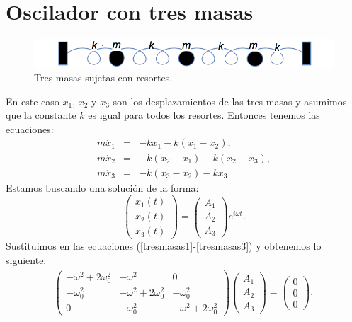 \documentclass[letterpaper,12pt,oneside]{book}
\begin{document}
\section{Oscilador con tres masas}
\begin{figure}
\centering
\includegraphics[scale=0.5]{fig/tresmasas}
\caption{\label{Tresmasas}  Tres masas sujetas con resortes.  }
\end{figure}
%
En este caso $x_1$, $x_2$ y $x_3$ son los desplazamientos de las tres masas y asumimos que la constante $k$ es igual para todos los resortes. Entonces tenemos las ecuaciones:
%
\begin{eqnarray}
m\ddot x_1 &=& -kx_1-k(x_1-x_2),\label{tresmasas1}\\
m\ddot x_2 &=& -k(x_2-x_1)-k(x_2-x_3)\label{tresmasas2},\\
m\ddot x_3 &=& -k(x_3-x_2)-kx_3.\label{tresmasas3}
\end{eqnarray}
%
Estamos buscando una soluci\'on de la forma:
%
\[\begin{pmatrix}
x_1(t)\\
x_2(t)\\
x_3(t)
\end{pmatrix} = \begin{pmatrix}
A_1 \\
A_2 \\
A_3 
\end{pmatrix}e^{i\omega t}.\]
%
Sustituimos en las ecuaciones (\ref{tresmasas1}-\ref{tresmasas3}) y obtenemos lo siguiente:
%
\begin{eqnarray}\begin{pmatrix}
-\omega ^2+2\omega_0^2 & -\omega ^2 & 0\\
-\omega_0^2 & -\omega ^2+2\omega_0^2 & -\omega_0^2\\
0 & -\omega_0^2 & -\omega ^2+2\omega_0^2
\end{pmatrix} \begin{pmatrix}
A_1 \\
A_2 \\
A_3 
\end{pmatrix}= \begin{pmatrix}
0 \\
0 \\
0 
\end{pmatrix}\label{tresmasaseq}, 
\end{eqnarray}
\end{document}
